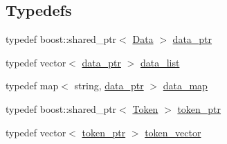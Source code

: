 \subsection*{Typedefs}
\begin{DoxyCompactItemize}
\item 
typedef boost\-::shared\-\_\-ptr$<$ \hyperlink{classxtd_1_1network_1_1http_1_1cpptempl_1_1Data}{Data} $>$ \hyperlink{namespacextd_1_1network_1_1http_1_1cpptempl_ad2f49991f1902699a98cf62bf0ae7ce6}{data\-\_\-ptr}
\item 
typedef vector$<$ \hyperlink{namespacextd_1_1network_1_1http_1_1cpptempl_ad2f49991f1902699a98cf62bf0ae7ce6}{data\-\_\-ptr} $>$ \hyperlink{namespacextd_1_1network_1_1http_1_1cpptempl_aff1b51bcf8064f69c85dd4833c1853b4}{data\-\_\-list}
\item 
typedef map$<$ string, \hyperlink{namespacextd_1_1network_1_1http_1_1cpptempl_ad2f49991f1902699a98cf62bf0ae7ce6}{data\-\_\-ptr} $>$ \hyperlink{namespacextd_1_1network_1_1http_1_1cpptempl_a638d1d81c8fb63c0bbafd508d6a2a007}{data\-\_\-map}
\item 
typedef boost\-::shared\-\_\-ptr$<$ \hyperlink{classxtd_1_1network_1_1http_1_1cpptempl_1_1Token}{Token} $>$ \hyperlink{namespacextd_1_1network_1_1http_1_1cpptempl_a09d1bd238d03342e60f0c20c679c0c88}{token\-\_\-ptr}
\item 
typedef vector$<$ \hyperlink{namespacextd_1_1network_1_1http_1_1cpptempl_a09d1bd238d03342e60f0c20c679c0c88}{token\-\_\-ptr} $>$ \hyperlink{namespacextd_1_1network_1_1http_1_1cpptempl_a38606cfbbfe81ed46ea9b0cf064de956}{token\-\_\-vector}
\end{DoxyCompactItemize}
